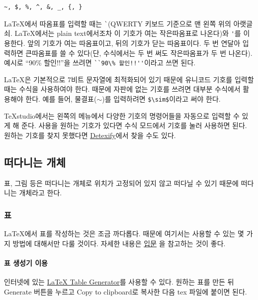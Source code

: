 \documentclass[11pt]{article}
\newcommand{\lshort}{%
	\href{http://texdoc.net/texmf-dist/doc/latex/%
		lshort-korean/lshort-kr.pdf%
	}{\LaTeXe 입문}%
}
\begin{document}
\begin{verbatim}
~, $, %, ^, &, _, {, }
\end{verbatim}

\LaTeX 에서 따옴표를 입력할 때는 \verb|`|(QWERTY 키보드 기준으로 맨 왼쪽 위의 
아랫글쇠. \LaTeX 에서는 plain text에서조차 이 기호가 여는 작은따옴표로 
나온다)와 \verb|'|를 이용한다. 앞의 기호가 여는 따옴표이고, 뒤의 기호가 닫는 
따옴표이다. 두 번 연달아 입력하면 큰따옴표를 쓸 수 있다(단, 수식에서는 두 번 
써도 작은따옴표가 두 번 나온다). 예시로 ``90\% 할인!!''을 쓰려면
\verb|``90\% 할인!!''|이라고 쓰면 된다.

\LaTeX 은 기본적으로 7비트 문자열에 최적화되어 있기 때문에 유니코드 기호를 
입력할 때는 수식을 사용하여야 한다. 때문에 자판에 없는 기호를 쓰려면 대부분 
수식에서 활용해야 한다. 예를 들어, 물결표($\sim$)를 입력하려면 
\verb|$\sim$|이라고 써야 한다.

TeXstudio에서는 왼쪽의 메뉴에서 다양한 기호의 명령어들을 자동으로 입력할 수 
있게 해 준다. 사용을 원하는 기호가 있다면 수식 모드에서 기호를 눌러 사용하면 
된다. 원하는 기호를 찾지 못했다면 
\href{http://detexify.kirelabs.org/classify.html}{Detexify}에서 찾을 수도 있다.

\subsection{떠다니는 개체}
표, 그림 등은 떠다니는 개체로 위치가 고정되어 있지 않고 떠다닐 수 있기 때문에 
떠다니는 개체라고 한다.

\subsubsection{표}
\LaTeX 에서 표를 작성하는 것은 조금 까다롭다. 때문에 여기서는 사용할 수 있는 
몇 가지 방법에 대해서만 다룰 것이다. 자세한 내용은 \lshort 을 참고하는 것이 
좋다.

\paragraph{표 생성기 이용}
인터넷에 있는 \href{www.tablesgenerator.com}{LaTeX Table Generator}를 사용할 
수 있다. 원하는 표를 만든 뒤 Generate 버튼을 누르고 Copy to clipboard로 복사한 
다음 tex 파일에 붙이면 된다.
\end{document}
